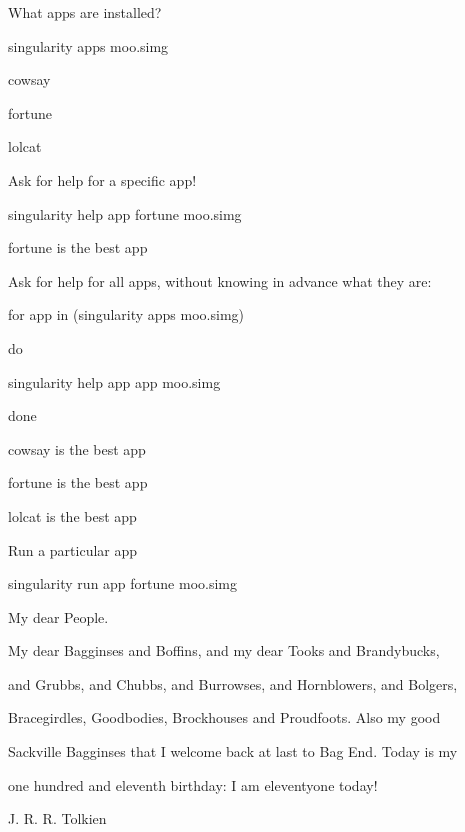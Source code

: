\documentclass[letterpaper,10pt,english]{sphinxmanual}
\begin{document}
What apps are installed?

%
\begin{sphinxVerbatim}[commandchars=\\\{\}]
singularity apps moo.simg

cowsay

fortune

lolcat
\end{sphinxVerbatim}

Ask for help for a specific app!

%
\begin{sphinxVerbatim}[commandchars=\\\{\}]
singularity help \PYGZhy{}\PYGZhy{}app fortune moo.simg

fortune is the best app
\end{sphinxVerbatim}

Ask for help for all apps, without knowing in advance what they are:

%
\begin{sphinxVerbatim}[commandchars=\\\{\}]
for app in \PYGZdl{}(singularity apps moo.simg)

   do

     singularity help \PYGZhy{}\PYGZhy{}app \PYGZdl{}app moo.simg

done

cowsay is the best app

fortune is the best app

lolcat is the best app
\end{sphinxVerbatim}

Run a particular app

%
\begin{sphinxVerbatim}[commandchars=\\\{\}]
singularity run \PYGZhy{}\PYGZhy{}app fortune moo.simg

    My dear People.

    My dear Bagginses and Boffins, and my dear Tooks and Brandybucks,

and Grubbs, and Chubbs, and Burrowses, and Hornblowers, and Bolgers,

Bracegirdles, Goodbodies, Brockhouses and Proudfoots.  Also my good

Sackville Bagginses that I welcome back at last to Bag End.  Today is my

one hundred and eleventh birthday: I am eleventy\PYGZhy{}one today!\PYGZdq{}

        \PYGZhy{}\PYGZhy{} J. R. R. Tolkien
\end{sphinxVerbatim}
\end{document}
